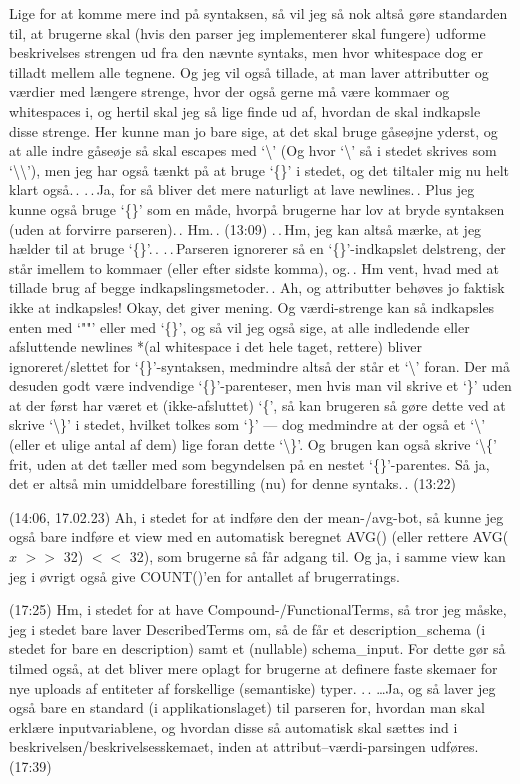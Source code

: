 \documentclass{report}
\begin{document}
Lige for at komme mere ind på syntaksen, så vil jeg så nok altså gøre standarden til, at brugerne skal (hvis den parser jeg implementerer skal fungere) udforme beskrivelses strengen ud fra den nævnte syntaks, men hvor whitespace dog er tilladt mellem alle tegnene. Og jeg vil også tillade, at man laver attributter og værdier med længere strenge, hvor der også gerne må være kommaer og whitespaces i, og hertil skal jeg så lige finde ud af, hvordan de skal indkapsle disse strenge. Her kunne man jo bare sige, at det skal bruge gåseøjne yderst, og at alle indre gåseøje så skal escapes med `\textbackslash' (Og hvor `\textbackslash' så i stedet skrives som `\textbackslash\textbackslash'), men jeg har også tænkt på at bruge `\{\}' i stedet, og det tiltaler mig nu helt klart også.\,. .\,.\,Ja, for så bliver det mere naturligt at lave newlines.\,. Plus jeg kunne også bruge `\{\}' som en måde, hvorpå brugerne har lov at bryde syntaksen (uden at forvirre parseren).\,. Hm.\,. (13:09) .\,.\,Hm, jeg kan altså mærke, at jeg hælder til at bruge `\{\}'.\,. .\,.\,Parseren ignorerer så en `\{\}'-indkapslet delstreng, der står imellem to kommaer (eller efter sidste komma), og.\,. Hm vent, hvad med at tillade brug af begge indkapslingsmetoder.\,. Ah, og attributter behøves jo faktisk ikke at indkapsles! Okay, det giver mening. Og værdi-strenge kan så indkapsles enten med `""' eller med `\{\}', og så vil jeg også sige, at alle indledende eller afsluttende newlines *(al whitespace i det hele taget, rettere) bliver ignoreret/slettet for `\{\}'-syntaksen, medmindre altså der står et `\textbackslash' foran. Der må desuden godt være indvendige `\{\}'-parenteser, men hvis man vil skrive et `\}' uden at der først har været et (ikke-afsluttet) `\{', så kan brugeren så gøre dette ved at skrive `\textbackslash\}' i stedet, hvilket tolkes som `\}' --- dog medmindre at der også et `\textbackslash' (eller et ulige antal af dem) lige foran dette `\textbackslash\}'. Og brugen kan også skrive `\textbackslash\{' frit, uden at det tæller med som begyndelsen på en nestet `\{\}'-parentes. Så ja, det er altså min umiddelbare forestilling (nu) for denne syntaks.\,. (13:22)

(14:06, 17.02.23) Ah, i stedet for at indføre den der mean-/avg-bot, så kunne jeg også bare indføre et view med en automatisk beregnet AVG() (eller rettere AVG($x$ $>>$ 32) $<<$ 32), som brugerne så får adgang til. Og ja, i samme view kan jeg i øvrigt også give COUNT()'en for antallet af brugerratings. 

(17:25) Hm, i stedet for at have Compound-/FunctionalTerms, så tror jeg måske, jeg i stedet bare laver DescribedTerms om, så de får et description\_schema (i stedet for bare en description) samt et (nullable) schema\_input. For dette gør så tilmed også, at det bliver mere oplagt for brugerne at definere faste skemaer for nye uploads af entiteter af forskellige (semantiske) typer. .\,. \ldots Ja, og så laver jeg også bare en standard (i applikationslaget) til parseren for, hvordan man skal erklære inputvariablene, og hvordan disse så automatisk skal sættes ind i beskrivelsen/beskrivelsesskemaet, inden at attribut--værdi-parsingen udføres. (17:39)
\end{document}
